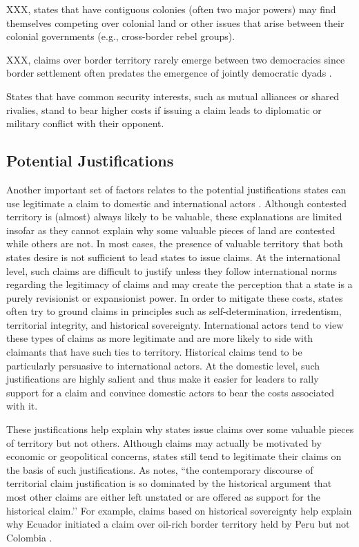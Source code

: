 XXX, states that have contiguous colonies (often two major powers) may find themselves competing over colonial land or other issues that arise between their colonial governments (e.g., cross-border rebel groups).

XXX, claims over border territory rarely emerge between two democracies since border settlement often predates the emergence of jointly democratic dyads \citep{gibler2012, gibler2018, owsiak2016d}. 


States that have common security interests, such as mutual alliances or shared rivalies, stand to bear higher costs if issuing a claim leads to diplomatic or military conflict with their opponent.



\subsection{Potential Justifications}

Another important set of factors relates to the potential justifications states can use legitimate a claim to domestic and international actors \citep{burghardt1973, murphy1990, abramson2015}. Although contested territory is (almost) always likely to be valuable, these explanations are limited insofar as they cannot explain why some valuable pieces of land are contested while others are not. In most cases, the presence of valuable territory that both states desire is not sufficient to lead states to issue claims. At the international level, such claims are difficult to justify unless they follow international norms regarding the legitimacy of claims and may create the perception that a state is a purely revisionist or expansionist power. In order to mitigate these costs, states often try to ground claims in principles such as self-determination, irredentism, territorial integrity, and historical sovereignty. International actors tend to view these types of claims as more legitimate and are more likely to side with claimants that have such ties to territory. Historical claims tend to be particularly persuasive to international actors. At the domestic level, such justifications are highly salient and thus make it easier for leaders to rally support for a claim and convince domestic actors to bear the costs associated with it. 

These justifications help explain why states issue claims over some valuable pieces of territory but not others. Although claims may actually be motivated by economic or geopolitical concerns, states still tend to legitimate their claims on the basis of such justifications. As \cite[][p. 544]{murphy1990} notes, ``the contemporary discourse of territorial claim justification is so dominated by the historical argument that most other claims are either left unstated or are offered as support for the historical claim.’’ For example, claims based on historical sovereignty help explain why Ecuador initiated a claim over oil-rich border territory held by Peru but not Colombia \citep{murphy1990}. 



